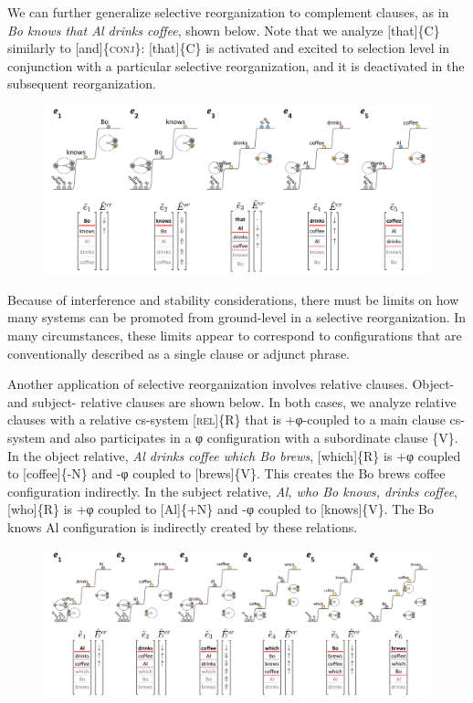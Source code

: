   We can further generalize selective reorganization to complement clauses, as in \textit{Bo knows that Al drinks coffee}, shown below. Note that we analyze [that]\{C\} similarly to [and]\{\textsc{conj}\}: [that]\{C\} is activated and excited to selection level in conjunction with a particular selective reorganization, and it is deactivated in the subsequent reorganization. 

  
\begin{figure}
\includegraphics[width=\textwidth]{figures/Tilsen-img101.png}
\caption{\missingcaption}
\label{fig:}
\end{figure}
 

  Because of interference and stability considerations, there must be limits on how many systems can be promoted from ground-level in a selective reorganization. In many circumstances, these limits appear to correspond to configurations that are conventionally described as a single clause or adjunct phrase.

  Another application of selective reorganization involves relative clauses. Object- and subject- relative clauses are shown below. In both cases, we analyze relative clauses with a relative cs-system [\textsc{rel}]\{R\} that is +φ-coupled to a main clause cs-system and also participates in a φ configuration with a subordinate clause \{V\}. In the object relative, \textit{Al drinks coffee which Bo brews}, [which]\{R\} is +φ coupled to [coffee]\{-N\} and -φ coupled to [brews]\{V\}. This creates the {\textbar}Bo brews coffee{\textbar} configuration indirectly. In the subject relative, \textit{Al, who Bo knows, drinks coffee}, [who]\{R\} is +φ coupled to [Al]\{+N\} and -φ coupled to [knows]\{V\}. The {\textbar}Bo knows Al{\textbar} configuration is indirectly created by these relations.

  
\begin{figure}
\includegraphics[width=\textwidth]{figures/Tilsen-img102.png}
\caption{\missingcaption}
\label{fig:}
\end{figure}
 

